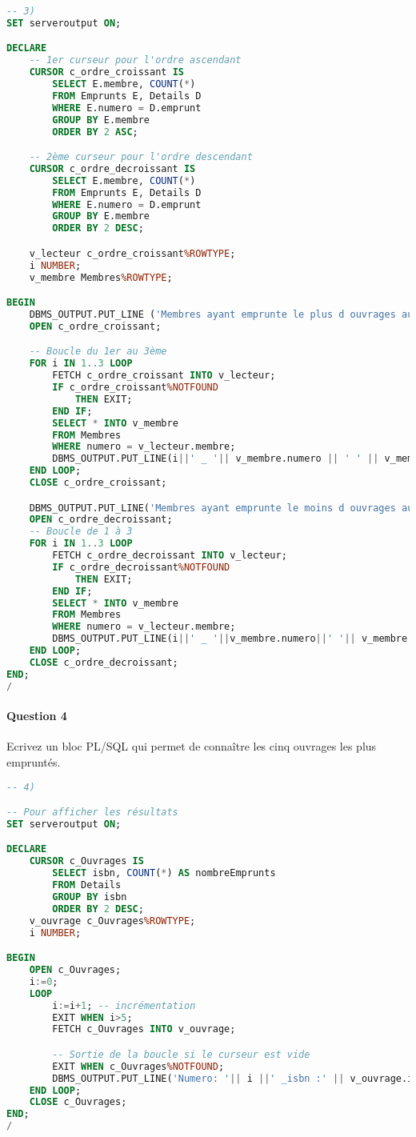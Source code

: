 \documentclass[10pt, oneside]{article}
\begin{document}
\begin{lstlisting}[language=sql, title=Question 3, label=QIV3]
-- 3)
SET serveroutput ON;

DECLARE
	-- 1er curseur pour l'ordre ascendant
	CURSOR c_ordre_croissant IS 
		SELECT E.membre, COUNT(*) 
		FROM Emprunts E, Details D
		WHERE E.numero = D.emprunt
		GROUP BY E.membre
		ORDER BY 2 ASC;

	-- 2ème curseur pour l'ordre descendant
	CURSOR c_ordre_decroissant IS
		SELECT E.membre, COUNT(*)
		FROM Emprunts E, Details D
		WHERE E.numero = D.emprunt
		GROUP BY E.membre
		ORDER BY 2 DESC;

	v_lecteur c_ordre_croissant%ROWTYPE;
	i NUMBER;
	v_membre Membres%ROWTYPE;

BEGIN
	DBMS_OUTPUT.PUT_LINE ('Membres ayant emprunte le plus d ouvrages au cours des 10 derniers mois');
	OPEN c_ordre_croissant;

	-- Boucle du 1er au 3ème
	FOR i IN 1..3 LOOP
		FETCH c_ordre_croissant INTO v_lecteur;
		IF c_ordre_croissant%NOTFOUND
			THEN EXIT;
		END IF;
		SELECT * INTO v_membre
		FROM Membres
		WHERE numero = v_lecteur.membre;
		DBMS_OUTPUT.PUT_LINE(i||' _ '|| v_membre.numero || ' ' || v_membre.nom);
	END LOOP;
	CLOSE c_ordre_croissant;

	DBMS_OUTPUT.PUT_LINE('Membres ayant emprunte le moins d ouvrages au cours des 10 derniers mois');
	OPEN c_ordre_decroissant;
	-- Boucle de 1 à 3
	FOR i IN 1..3 LOOP
		FETCH c_ordre_decroissant INTO v_lecteur;
		IF c_ordre_decroissant%NOTFOUND
			THEN EXIT;
		END IF;
		SELECT * INTO v_membre
		FROM Membres
		WHERE numero = v_lecteur.membre;
		DBMS_OUTPUT.PUT_LINE(i||' _ '||v_membre.numero||' '|| v_membre.nom);
	END LOOP;
	CLOSE c_ordre_decroissant;
END;
/
\end{lstlisting}


\paragraph{Question 4} Ecrivez un bloc PL/SQL qui permet de connaître les cinq ouvrages les plus empruntés.

\begin{lstlisting}[language=sql, title=Question 4, label=QIV4]
-- 4)

-- Pour afficher les résultats
SET serveroutput ON;

DECLARE
	CURSOR c_Ouvrages IS 
		SELECT isbn, COUNT(*) AS nombreEmprunts
		FROM Details
		GROUP BY isbn
		ORDER BY 2 DESC;
	v_ouvrage c_Ouvrages%ROWTYPE;
	i NUMBER;

BEGIN 
	OPEN c_Ouvrages;
	i:=0;
	LOOP
		i:=i+1; -- incrémentation
		EXIT WHEN i>5;
		FETCH c_Ouvrages INTO v_ouvrage;

		-- Sortie de la boucle si le curseur est vide
		EXIT WHEN c_Ouvrages%NOTFOUND;
		DBMS_OUTPUT.PUT_LINE('Numero: '|| i ||' _isbn :' || v_ouvrage.isbn);
	END LOOP;
	CLOSE c_Ouvrages;
END;
/
\end{lstlisting}
\end{document}
